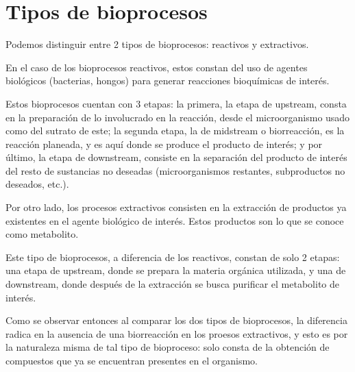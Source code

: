 
\section{Tipos de bioprocesos}

Podemos distinguir entre 2 tipos de bioprocesos: reactivos y extractivos.

En el caso de los bioprocesos reactivos, estos constan del uso de agentes biológicos (bacterias, hongos) para generar reacciones bioquímicas de interés.

Estos bioprocesos cuentan con 3 etapas: la primera, la etapa de upstream, consta en la preparación de lo involucrado en la reacción, desde el microorganismo usado como del sutrato de este; la segunda etapa, la de midstream o biorreacción, es la reacción planeada, y es aquí donde se produce el producto de interés; y por último, la etapa de downstream, consiste en la separación del producto de interés del resto de sustancias no deseadas (microorganismos restantes, subproductos no deseados, etc.).

Por otro lado, los procesos extractivos consisten en la extracción de productos ya existentes en el agente biológico de interés. Estos productos son lo que se conoce como metabolito.

Este tipo de bioprocesos, a diferencia de los reactivos, constan de solo 2 etapas: una etapa de upstream, donde se prepara la materia orgánica utilizada, y una de downstream, donde después de la extracción se busca purificar el metabolito de interés.

Como se observar entonces al comparar los dos tipos de bioprocesos, la diferencia radica en la ausencia de una biorreacción en los proesos extractivos, y esto es por la naturaleza misma de tal tipo de bioproceso: solo consta de la obtención de compuestos que ya se encuentran presentes en el organismo.